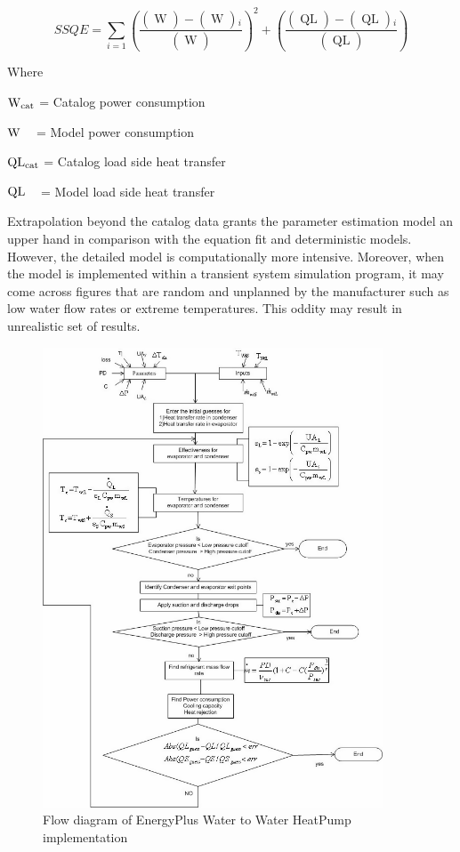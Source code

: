 \begin{equation}
SSQE = \sum\limits_{i = 1} {{{\left( {\frac{{\left( {\mathop {W{}_{cat}}\limits^{} } \right) - \left( {\mathop W\limits^{} } \right){}_i}}{{\left( {\mathop {W{}_{cat}}\limits^{} } \right)}}} \right)}^2}}  + \left( {\frac{{\left( {\mathop {QL{}_{cat}}\limits^{} } \right) - \left( {\mathop {QL}\limits^{} } \right){}_i}}{{\left( {\mathop {QL{}_{cat}}\limits^{} } \right)}}} \right)
\end{equation}

Where

\({\rm{W}}{}_{{\rm{cat}}}\) = Catalog power consumption

\({\rm{W}}{}_{}\) ~ = Model power consumption

\({\rm{QL}}{}_{{\rm{cat}}}\) = Catalog load side heat transfer

\({\rm{QL}}{}_{}\) ~ = Model load side heat transfer

Extrapolation beyond the catalog data grants the parameter estimation model an upper hand in comparison with the equation fit and deterministic models. However, the detailed model is computationally more intensive. Moreover, when the model is implemented within a transient system simulation program, it may come across figures that are random and unplanned by the manufacturer such as low water flow rates or extreme temperatures. This oddity may result in unrealistic set of results.

\begin{figure}[hbtp] %
\centering
\includegraphics[width=0.9\textwidth, height=0.9\textheight, keepaspectratio=true]{media/image5314.png}
\caption{  Flow diagram of EnergyPlus Water to Water HeatPump implementation \protect \label{fig:flow-diagram-of-energyplus-water-to-water}}
\end{figure}

